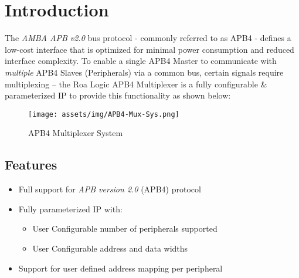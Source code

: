 \chapter{Introduction}\label{introduction}

The \emph{AMBA APB v2.0} bus protocol - commonly referred to as APB4 - 
defines a low-cost interface that is optimized for minimal power
consumption and reduced interface complexity. To enable a single APB4
Master to communicate with \emph{multiple} APB4 Slaves (Peripherals) via
a common bus, certain signals require multiplexing -- the Roa Logic APB4
Multiplexer is a fully configurable \& parameterized IP to provide this
functionality as shown below:

\begin{figure}[th]
	\centering
	\texttt{[image: assets/img/APB4-Mux-Sys.png]}
	\caption{APB4 Multiplexer System}
	\label{fig:apb4-mux-sys}
\end{figure}

\section{Features}\label{features}

\begin{itemize}
\item
  Full support for \emph{APB version 2.0} (APB4) protocol
\item
  Fully parameterized IP with:
  \begin{itemize}
  \item
    User Configurable number of peripherals supported
  \item
    User Configurable address and data widths
  \end{itemize}
\item
  Support for user defined address mapping per peripheral
\end{itemize}